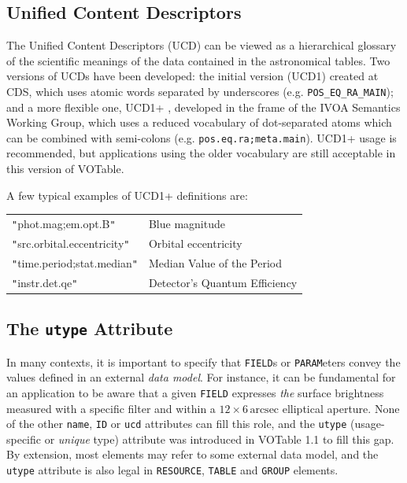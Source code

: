 \documentclass[11pt,a4paper]{ivoa}
\let\fg=\color
\def\attr#1{{\tt{\fg{DarkRed}#1}}}
\def\elem#1{{\tt{\fg{DarkRed}#1}}}
\def\literalvalue#1{{\tt"}{{\fg{DarkPurple}#1}}{\tt"}}
\begin{document}
\subsection{Unified Content Descriptors}
\label{sec:ucd}

The Unified Content Descriptors (UCD) can be viewed as a
hierarchical glossary of the scientific meanings of the data
contained in the astronomical tables.
Two versions of UCDs have been developed:
the initial version (UCD1) created at CDS, which uses
atomic words separated by underscores (e.g. {\tt POS\_EQ\_RA\_MAIN});
and a more flexible one, UCD1+ \citep{2021ivoa.spec.0616C},
developed in the frame of the IVOA Semantics Working Group, which uses
a reduced vocabulary of dot-separated atoms which can be
combined with semi-colons (e.g. {\tt pos.eq.ra;meta.main}).
UCD1+ usage is recommended, but applications using the older
vocabulary are still acceptable in this version of VOTable.

\noindent A few typical examples of UCD1+ definitions
 are:

\begin{tabular}{ll}
{\literalvalue{phot.mag;em.opt.B}}        &  Blue magnitude \\
{\literalvalue{src.orbital.eccentricity}} &  Orbital eccentricity \\
{\literalvalue{time.period;stat.median}}  &  Median Value of the Period \\
{\literalvalue{instr.det.qe}}             &  Detector's Quantum Efficiency \\
\end{tabular}


\subsection{The \attr{utype} Attribute}
\label{sec:utype}
In many contexts, it is important to specify that \elem{FIELD}s or
\elem{PARAM}eters convey the values defined in an external {\em data
model}. For instance, it can be fundamental for an application to
be aware that a given \elem{FIELD} expresses \emph{the} surface brightness
measured with a specific filter and within a
$12\times6\,\textrm{arcsec}$ elliptical aperture.
None of the other \attr{name}, \attr{ID}
or \attr{ucd} attributes can fill this role, and
the \attr{utype} (usage-specific or {\em unique} type) attribute was
introduced in VOTable 1.1 to fill this gap.
By extension, most elements may refer to some external data model,
and the \attr{utype} attribute is also legal in \elem{RESOURCE},
\elem{TABLE} and \elem{GROUP} elements.
\end{document}
